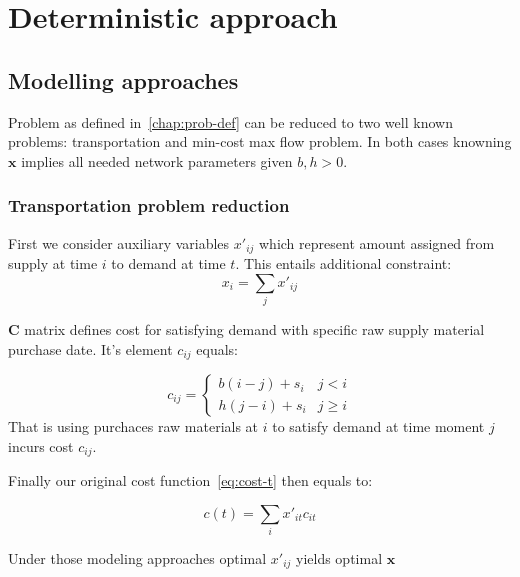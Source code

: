 
\chapter{Deterministic approach}
\label{chap:Deterministic approach}

\section{Modelling approaches}

Problem as defined in~\ref{chap:prob-def} can be reduced to two well known problems: transportation and min-cost max flow problem. In both cases knowning $\mathbf{x}$ implies all needed network parameters given $b, h > 0$.

\subsection{Transportation problem reduction}
\label{subs:Transportation problem reduction}

First we consider auxiliary variables $x'_{ij}$ which represent amount assigned from supply at time $i$ to demand at time $t$. This entails additional constraint:
\[x_i = \sum_j{x'_{ij}}\]

\begin{definition}{$\mathbf{C}$}
matrix defines cost for satisfying demand with specific raw supply material purchase date. It's element $c_{ij}$ equals:

\begin{equation*}
    c_{ij} = \begin{cases}
        b \left( i - j \right) + s_i & j < i \\
        h \left( j - i \right) + s_i & j \ge i
    \end{cases}
\end{equation*}
That is using purchaces raw materials at $i$ to satisfy demand at time moment $j$ incurs cost $c_{ij}$.
\end{definition}

Finally our original cost function~\ref{eq:cost-t} then equals to:

\begin{equation}
    \label{eq:cost-trans-t}
    c(t) = \sum_i{x'_{it}c_{it}}
\end{equation}

Under those modeling approaches optimal $x'_{ij}$ yields optimal $\mathbf{x}$ 

